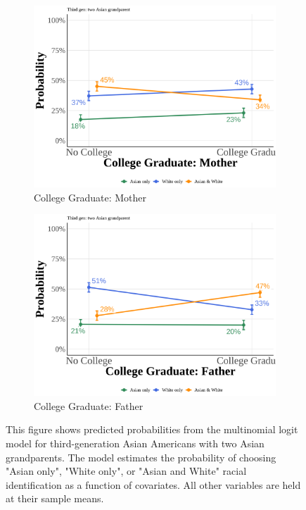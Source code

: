 \begin{center}
\begin{figure}[!htb]
\vspace{0.5cm}

\begin{subfigure}{.48\textwidth}
\caption{College Graduate: Mother}
\centering
\includegraphics[width=1\linewidth]{simple_pp_MomGradCollege_third_two.png}
\end{subfigure}
\hfill
\begin{subfigure}{.48\textwidth}
\caption{College Graduate: Father}
\centering
\includegraphics[width=1\linewidth]{simple_pp_DadGradCollege_third_two.png}
\end{subfigure}

\caption*{\footnotesize{This figure shows predicted probabilities from the multinomial logit model for third-generation Asian Americans with two Asian grandparents. The model estimates the probability of choosing "Asian only", "White only", or "Asian and White" racial identification as a function of covariates. All other variables are held at their sample means.}}
\end{figure}
\end{center}

